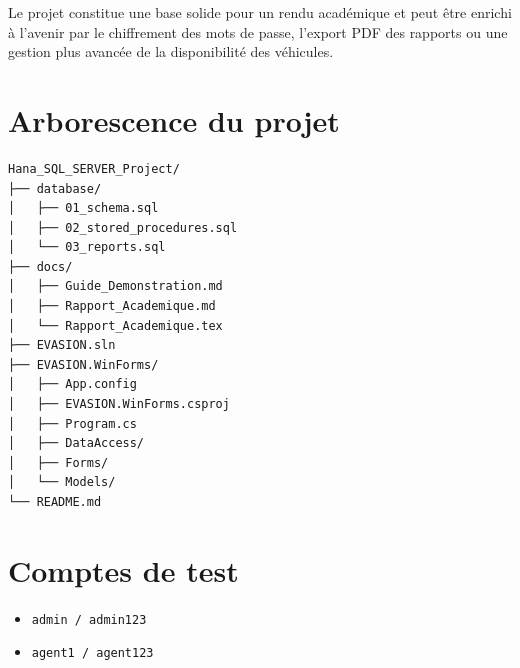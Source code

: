 \documentclass[12pt,a4paper]{report}
\begin{document}
Le projet constitue une base solide pour un rendu académique et peut être enrichi à l'avenir par le chiffrement des mots de passe, l'export PDF des rapports ou une gestion plus avancée de la disponibilité des véhicules.

\appendix
\chapter{Arborescence du projet}
\begin{verbatim}
Hana_SQL_SERVER_Project/
├── database/
│   ├── 01_schema.sql
│   ├── 02_stored_procedures.sql
│   └── 03_reports.sql
├── docs/
│   ├── Guide_Demonstration.md
│   ├── Rapport_Academique.md
│   └── Rapport_Academique.tex
├── EVASION.sln
├── EVASION.WinForms/
│   ├── App.config
│   ├── EVASION.WinForms.csproj
│   ├── Program.cs
│   ├── DataAccess/
│   ├── Forms/
│   └── Models/
└── README.md
\end{verbatim}

\chapter{Comptes de test}
\begin{itemize}[leftmargin=1.2cm]
    \item \texttt{admin / admin123}
    \item \texttt{agent1 / agent123}
\end{itemize}
\end{document}
